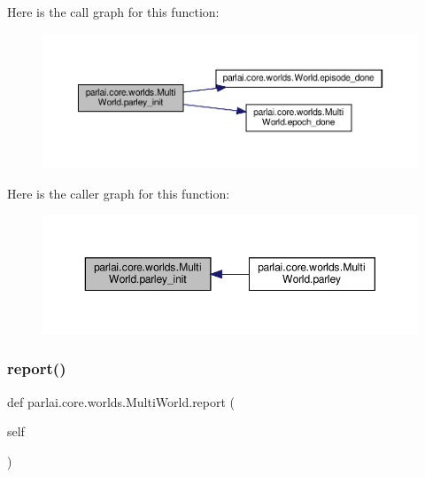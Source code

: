 Here is the call graph for this function\+:
\nopagebreak
\begin{figure}[H]
\begin{center}
\leavevmode
\includegraphics[width=350pt]{classparlai_1_1core_1_1worlds_1_1MultiWorld_a9f2f4de7791e3b295359039e9d26a523_cgraph}
\end{center}
\end{figure}
Here is the caller graph for this function\+:
\nopagebreak
\begin{figure}[H]
\begin{center}
\leavevmode
\includegraphics[width=350pt]{classparlai_1_1core_1_1worlds_1_1MultiWorld_a9f2f4de7791e3b295359039e9d26a523_icgraph}
\end{center}
\end{figure}
\mbox{\label{classparlai_1_1core_1_1worlds_1_1MultiWorld_aa89365baa3672e08d8e239199df4eda7}} 
\subsubsection{\texorpdfstring{report()}{report()}}
{\footnotesize\ttfamily def parlai.\+core.\+worlds.\+Multi\+World.\+report (\begin{DoxyParamCaption}\item[{}]{self }\end{DoxyParamCaption})}

